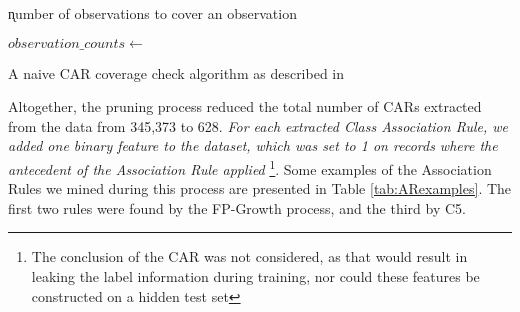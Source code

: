 \begin{algorithm}[h]

\k{number of observations to cover an observation}
\BlankLine

$observation\_counts \gets$  \;
\caption{A naive CAR coverage check algorithm as described in \cite{cmar}} \label{alg:coveragecheck}
\end{algorithm}
 
 
 Altogether, the pruning process reduced the total number of CARs extracted from the data from 345,373 to 628.
 \textit{For each extracted Class Association Rule, we added one binary feature to the dataset,
 which was set to 1 on records where the antecedent of the Association Rule applied} \footnote{The conclusion of the CAR was not considered, as that would result in leaking the label information during training, nor could these features be constructed on a hidden test set}. Some examples
 of the Association Rules we mined during this process are presented in Table \ref{tab:ARexamples}. The first two rules were found by the \textsf{FP-Growth}
 process, and the third by \textsf{C5}.
 
